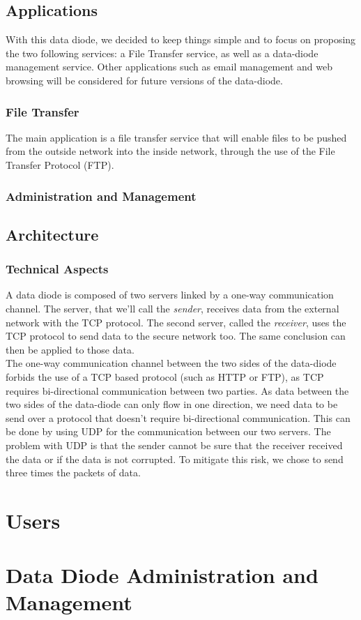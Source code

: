 \documentclass[a4paper,11pt]{article}
\begin{document}
\subsection{Applications}
With this data diode, we decided to keep things simple and to focus on proposing the two following services: a File Transfer service, as well as a data-diode management service. 
Other applications such as email management and web browsing will be considered for future versions of the data-diode.

\subsubsection{File Transfer}
The main application is a file transfer service that will enable files to be pushed from the outside network into the inside network, through the use of the File Transfer Protocol (FTP).

\subsubsection{Administration and Management}


\subsection{Architecture}
\subsubsection{Technical Aspects}
A data diode is composed of two servers linked by a one-way communication channel. The server, that we'll call the \textit{sender}, receives data from the external network with the TCP protocol. The second server, called the \textit{receiver}, uses the TCP protocol to send data to the secure network too. The same conclusion can then be applied to those data.\\

The one-way communication channel between the two sides of the data-diode forbids the use of a TCP based protocol (such as HTTP or FTP), as TCP requires bi-directional communication between two parties. As data between the two sides of the data-diode can only flow in one direction, we need data to be send over a protocol that doesn't require bi-directional communication. This can be done by using UDP for the communication between our two servers. The problem with UDP is that the sender cannot be sure that the receiver received the data or if the data is not corrupted. To mitigate this risk, we chose to send three times the packets of data.


\section{Users}

\section{Data Diode Administration and Management}
\end{document}
